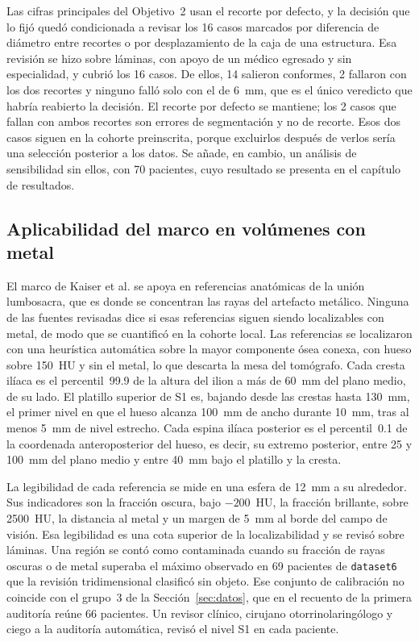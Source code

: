 Las cifras principales del Objetivo~2 usan el recorte por defecto, y la decisión que lo fijó quedó condicionada a revisar los 16 casos marcados por diferencia de diámetro entre recortes o por desplazamiento de la caja de una estructura. Esa revisión se hizo sobre láminas, con apoyo de un médico egresado y sin especialidad, y cubrió los 16 casos. De ellos, 14 salieron conformes, 2 fallaron con los dos recortes y ninguno falló solo con el de 6~mm, que es el único veredicto que habría reabierto la decisión. El recorte por defecto se mantiene; los 2 casos que fallan con ambos recortes son errores de segmentación y no de recorte. Esos dos casos siguen en la cohorte preinscrita, porque excluirlos después de verlos sería una selección posterior a los datos. Se añade, en cambio, un análisis de sensibilidad sin ellos, con 70 pacientes, cuyo resultado se presenta en el capítulo de resultados.

\subsection{Aplicabilidad del marco en volúmenes con metal}\label{sec:marco-metal}

El marco de Kaiser et al. se apoya en referencias anatómicas de la unión lumbosacra, que es donde se concentran las rayas del artefacto metálico. Ninguna de las fuentes revisadas dice si esas referencias siguen siendo localizables con metal, de modo que se cuantificó en la cohorte local. Las referencias se localizaron con una heurística automática sobre la mayor componente ósea conexa, con hueso sobre 150~HU y sin el metal, lo que descarta la mesa del tomógrafo. Cada cresta ilíaca es el percentil~99.9 de la altura del ilion a más de 60~mm del plano medio, de su lado. El platillo superior de S1 es, bajando desde las crestas hasta 130~mm, el primer nivel en que el hueso alcanza 100~mm de ancho durante 10~mm, tras al menos 5~mm de nivel estrecho. Cada espina ilíaca posterior es el percentil~0.1 de la coordenada anteroposterior del hueso, es decir, su extremo posterior, entre 25 y 100~mm del plano medio y entre 40~mm bajo el platillo y la cresta.

La legibilidad de cada referencia se mide en una esfera de 12~mm a su alrededor. Sus indicadores son la fracción oscura, bajo $-200$~HU, la fracción brillante, sobre 2500~HU, la distancia al metal y un margen de 5~mm al borde del campo de visión. Esa legibilidad es una cota superior de la localizabilidad y se revisó sobre láminas. Una región se contó como contaminada cuando su fracción de rayas oscuras o de metal superaba el máximo observado en 69 pacientes de \texttt{dataset6} que la revisión tridimensional clasificó sin objeto. Ese conjunto de calibración no coincide con el grupo~3 de la Sección~\ref{sec:datos}, que en el recuento de la primera auditoría reúne 66 pacientes. Un revisor clínico, cirujano otorrinolaringólogo y ciego a la auditoría automática, revisó el nivel S1 en cada paciente.

